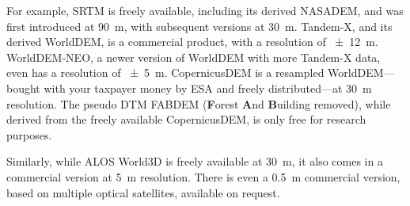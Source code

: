 %

For example, SRTM is freely available, including its derived NASADEM, and was first introduced at \qty{90}{m}, with subsequent versions at \qty{30}{m}.
Tandem-X, and its derived WorldDEM, is a commercial product, with a resolution of \qty{\pm12}{m}.
WorldDEM-NEO, a newer version of WorldDEM with more Tandem-X data, even has a resolution of \qty{\pm5}{m}.
CopernicusDEM is a resampled WorldDEM---bought with your taxpayer money by ESA and freely distributed---at \qty{30}{m} resolution.
The pseudo DTM FABDEM (\textbf{F}orest \textbf{A}nd \textbf{B}uilding removed), while derived from the freely available CopernicusDEM, is only free for research purposes.

Similarly, while ALOS World3D is freely available at \qty{30}{m}, it also comes in a commercial version at \qty{5}{m} resolution.
There is even a \qty{0.5}{m} commercial version, based on multiple optical satellites, available on request.




